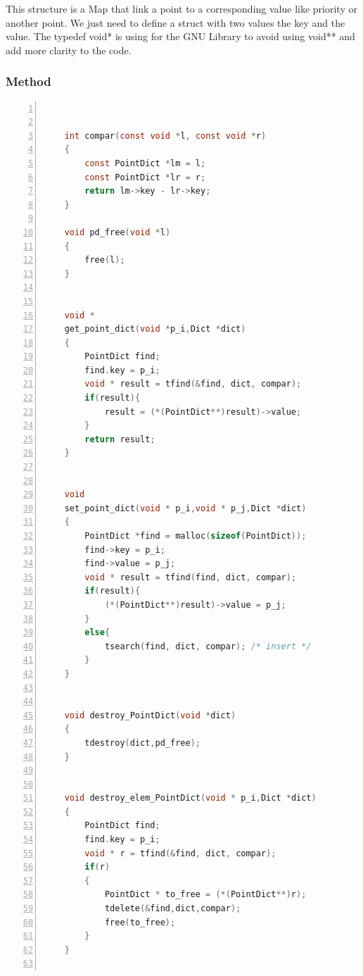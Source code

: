 \documentclass[twoside,12pt, a4paper]{report}
\begin{document}
This structure is a Map that link a point to a corresponding value like priority or another point. We just need to define a struct with two values the key and the value. The typedef void* is using for the GNU Library to avoid using void** and add more clarity to the code. 

\subsubsection{Method}

\begin{lstlisting}[language=C, % Spécifie le langage du code
	caption={Point Map Methods}, % Légende du listing
	label=lst:pmap_c, % Étiquette pour référencer le listing
	numbers=left, 
	numberstyle=\tiny\color{gray}, 
	stepnumber=1, 
	frame=single,
	breaklines=true, 
	postbreak=\mbox{\textcolor{red}{$\hookrightarrow$}\space},
	showstringspaces=false 
	]
	
	
	int compar(const void *l, const void *r)
	{
		const PointDict *lm = l;
		const PointDict *lr = r;
		return lm->key - lr->key;
	}
	
	void pd_free(void *l)
	{
		free(l);
	}
	
	
	void *
	get_point_dict(void *p_i,Dict *dict)
	{
		PointDict find;
		find.key = p_i;
		void * result = tfind(&find, dict, compar);
		if(result){
			result = (*(PointDict**)result)->value;
		}
		return result;
	}
	
	
	void
	set_point_dict(void * p_i,void * p_j,Dict *dict)
	{
		PointDict *find = malloc(sizeof(PointDict));
		find->key = p_i;
		find->value = p_j;
		void * result = tfind(find, dict, compar);
		if(result){
			(*(PointDict**)result)->value = p_j;
		}
		else{
			tsearch(find, dict, compar); /* insert */
		}
	}
	
	
	void destroy_PointDict(void *dict)
	{
		tdestroy(dict,pd_free);
	}
	
	
	void destroy_elem_PointDict(void * p_i,Dict *dict)
	{
		PointDict find;
		find.key = p_i;
		void * r = tfind(&find, dict, compar);
		if(r)
		{
			PointDict * to_free = (*(PointDict**)r);
			tdelete(&find,dict,compar);
			free(to_free);
		}
	}
	
\end{lstlisting}
\end{document}
